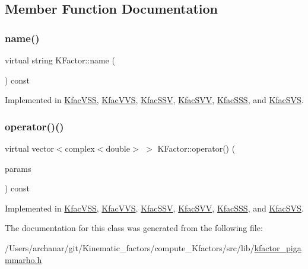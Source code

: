 \subsection{Member Function Documentation}
\mbox{\label{classKFactor_ae578f8d6e4b525895427717da99cab6c}} 
\subsubsection{\texorpdfstring{name()}{name()}}
{\footnotesize\ttfamily virtual string K\+Factor\+::name (\begin{DoxyParamCaption}{ }\end{DoxyParamCaption}) const\hspace{0.3cm}{\ttfamily [pure virtual]}}



Implemented in \mbox{\hyperlink{classKfacVSS_a12bff0a61d6252df4e362d35c907a877}{Kfac\+V\+SS}}, \mbox{\hyperlink{classKfacVVS_a2bd46e36671569204826348d5ec6d64a}{Kfac\+V\+VS}}, \mbox{\hyperlink{classKfacSSV_a72d5e577525fa97365dbcfd4c5bea88d}{Kfac\+S\+SV}}, \mbox{\hyperlink{classKfacSVV_ad7ab40ec924a678cd785a9743e676d6c}{Kfac\+S\+VV}}, \mbox{\hyperlink{classKfacSSS_a2c22369b8bb0ac1be72f981c8c119719}{Kfac\+S\+SS}}, and \mbox{\hyperlink{classKfacSVS_af7a1fd20af79d6a2f844cf4418a5eeb8}{Kfac\+S\+VS}}.

\mbox{\label{classKFactor_a012aae9ff4a07eab86d5d50b7f774285}} 
\subsubsection{\texorpdfstring{operator()()}{operator()()}}
{\footnotesize\ttfamily virtual vector$<$complex$<$double$>$ $>$ K\+Factor\+::operator() (\begin{DoxyParamCaption}\item[{const \mbox{\hyperlink{classKFacParams}{K\+Fac\+Params}} \&}]{params }\end{DoxyParamCaption}) const\hspace{0.3cm}{\ttfamily [pure virtual]}}



Implemented in \mbox{\hyperlink{classKfacVSS_a608b90a0b3fcdd1126e63c4ef68ce3e1}{Kfac\+V\+SS}}, \mbox{\hyperlink{classKfacVVS_ae892df7c0a0595020b968fd9c87be256}{Kfac\+V\+VS}}, \mbox{\hyperlink{classKfacSSV_aeea4f3f068452d233d4111d72c05cd4f}{Kfac\+S\+SV}}, \mbox{\hyperlink{classKfacSVV_acb7f7f6bf0957694a73271704bb0569f}{Kfac\+S\+VV}}, \mbox{\hyperlink{classKfacSSS_a25ca7daf4005bf951ad67d568e3f3936}{Kfac\+S\+SS}}, and \mbox{\hyperlink{classKfacSVS_a1bcfae29380c602c7040ad790ccff63f}{Kfac\+S\+VS}}.



The documentation for this class was generated from the following file\+:\begin{DoxyCompactItemize}
\item 
/\+Users/archanar/git/\+Kinematic\+\_\+factors/compute\+\_\+\+Kfactors/src/lib/\mbox{\hyperlink{kfactor__pigammarho_8h}{kfactor\+\_\+pigammarho.\+h}}\end{DoxyCompactItemize}
